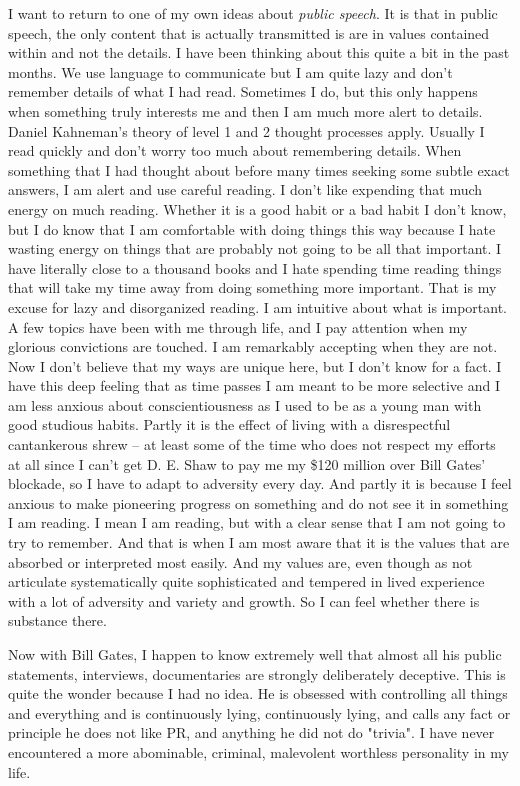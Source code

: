 \documentclass{amsart}
\begin{document}
I want to return to one of my own ideas about {\em public speech}.  It is that in public speech, the only content that is actually transmitted is are in values contained within and not the details.  I have been thinking about this quite a bit in the past months.  We use language to communicate but I am quite lazy and don't remember details of what I had read.  Sometimes I do, but this only happens when something truly interests me and then I am much more alert to details.  Daniel Kahneman's theory of level 1 and 2 thought processes apply.  Usually I read quickly and don't worry too much about remembering details.  When something that I had thought about before many times seeking some subtle exact answers, I am alert and use careful reading.  I don't like expending that much energy on much reading.  Whether it is a good habit or a bad habit I don't know, but I do know that I am comfortable with doing things this way because I hate wasting energy on things that are probably not going to be all that important.  I have literally close to a thousand books and I hate spending time reading things that will take my time away from doing something more important.  That is my excuse for lazy and disorganized reading.  I am intuitive about what is important.  A few topics have been with me through life, and I pay attention when my glorious convictions are touched.  I am remarkably accepting when they are not.  Now I don't believe that my ways are unique here, but I don't know for a fact.  I have this deep feeling that as time passes I am meant to be more selective and I am less anxious about conscientiousness as I used to be as a young man with good studious habits.  Partly it is the effect of living with a disrespectful cantankerous shrew -- at least some of the time who does not respect my efforts at all since I can't get D. E. Shaw to pay me my \$120 million over Bill Gates' blockade, so I have to adapt to adversity every day.  And partly it is because I feel anxious to make pioneering progress on something and do not see it in something I am reading.  I mean I am reading, but with a clear sense that I am not going to try to remember.  And that is when I am most aware that it is the values that are absorbed or interpreted most easily.  And my values are, even though as not articulate systematically quite sophisticated and tempered in lived experience with a lot of adversity and variety and growth.  So I can feel whether there is substance there.

Now with Bill Gates, I happen to know extremely well that almost all his public statements, interviews,  documentaries are strongly deliberately deceptive.  This is quite the wonder because I had no idea.  He is obsessed with controlling all things and everything and is continuously lying, continuously lying, and calls any fact or principle he does not like PR, and anything he did not do "trivia".  I have never encountered a more abominable, criminal, malevolent worthless personality in my life.
\end{document}
